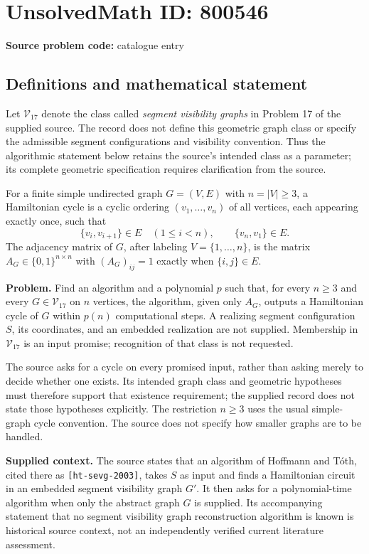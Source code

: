 \documentclass[11pt]{article}
\begin{document}
\section*{UnsolvedMath ID: 800546}
\textbf{Source problem code:} catalogue entry
\subsection{Definitions and mathematical statement}
Let \(\mathcal V_{17}\) denote the class called \emph{segment visibility graphs} in Problem 17 of the supplied source. The record does not define this geometric graph class or specify the admissible segment configurations and visibility convention. Thus the algorithmic statement below retains the source's intended class as a parameter; its complete geometric specification requires clarification from the source.

For a finite simple undirected graph \(G=(V,E)\) with \(n=|V|\geq 3\), a Hamiltonian cycle is a cyclic ordering \((v_1,\ldots,v_n)\) of all vertices, each appearing exactly once, such that
\[
\{v_i,v_{i+1}\}\in E\quad(1\leq i<n),
\qquad \{v_n,v_1\}\in E.
\]
The adjacency matrix of \(G\), after labeling \(V=\{1,\ldots,n\}\), is the matrix \(A_G\in\{0,1\}^{n\times n}\) with \((A_G)_{ij}=1\) exactly when \(\{i,j\}\in E\).

\textbf{Problem.} Find an algorithm and a polynomial \(p\) such that, for every \(n\geq 3\) and every \(G\in\mathcal V_{17}\) on \(n\) vertices, the algorithm, given only \(A_G\), outputs a Hamiltonian cycle of \(G\) within \(p(n)\) computational steps. A realizing segment configuration \(S\), its coordinates, and an embedded realization are not supplied. Membership in \(\mathcal V_{17}\) is an input promise; recognition of that class is not requested.

The source asks for a cycle on every promised input, rather than asking merely to decide whether one exists. Its intended graph class and geometric hypotheses must therefore support that existence requirement; the supplied record does not state those hypotheses explicitly. The restriction \(n\geq 3\) uses the usual simple-graph cycle convention. The source does not specify how smaller graphs are to be handled.

\textbf{Supplied context.} The source states that an algorithm of Hoffmann and T\'{o}th, cited there as \texttt{[ht-sevg-2003]}, takes \(S\) as input and finds a Hamiltonian circuit in an embedded segment visibility graph \(G'\). It then asks for a polynomial-time algorithm when only the abstract graph \(G\) is supplied. Its accompanying statement that no segment visibility graph reconstruction algorithm is known is historical source context, not an independently verified current literature assessment.
\end{document}
